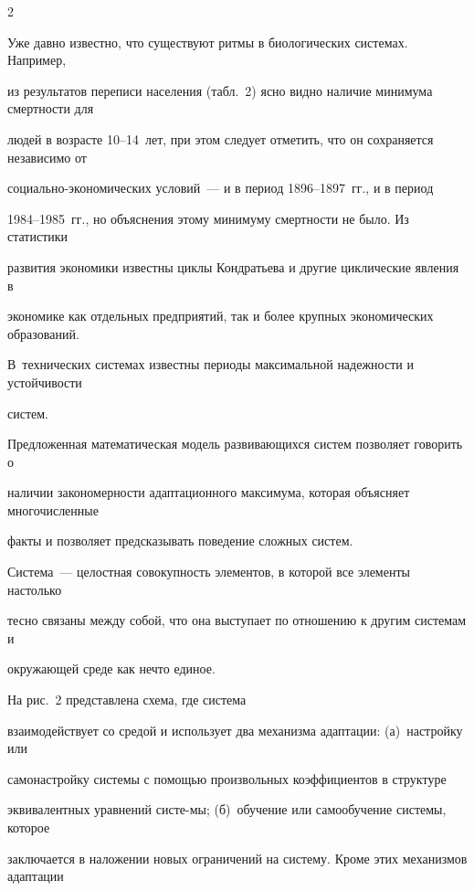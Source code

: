 \begin{multicols}{2}
      


      Уже давно известно, что существуют ритмы в биологических сис\-те\-мах. Например, 


из результатов переписи населения (табл.~2) ясно видно наличие минимума смертности для 


людей в возрасте 10--14~лет, при этом следует отметить, что он сохраняется независимо от 


со\-ци\-аль\-но-эко\-но\-ми\-че\-ских условий~--- и в период 1896--1897~гг., и в период 


      1984--1985~гг., но объяснения этому минимуму смертности не было. Из статистики 


развития экономики известны циклы Кондратьева и другие циклические явления в 


экономике как отдельных предприятий, так и более крупных экономических образований. 


В~технических сис\-те\-мах известны периоды максимальной надежности и устойчивости 


систем. 





Предложенная математическая модель развивающихся систем позволяет говорить о 


наличии закономерности адаптационного максимума, которая объясняет многочисленные 


факты и позволяет предсказывать поведение сложных сис\-тем. 


      


      Сис\-те\-ма~--- целостная совокупность элементов, в которой все элементы настолько 


тесно связаны между собой, что она выступает по отношению к другим сис\-те\-мам и 


окружающей среде как нечто единое. 





На рис.~2 представлена схема, где сис\-те\-ма 


взаимодействует со средой и использует два механизма адаптации: (а)~настройку или 


самонастройку сис\-те\-мы с помощью произвольных коэффициентов в структуре 


эквивалентных уравнений сис\-те-\linebreak мы; (б)~обучение или самообучение сис\-те\-мы, которое 


заключается в наложении новых ограничений на систему. Кроме этих механизмов адап\-та\-ции 



\end{multicols}
